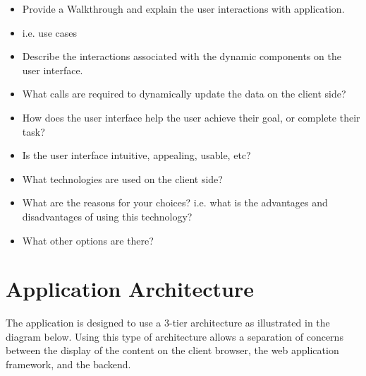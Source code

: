 \documentclass{sig-alt-release2}
\begin{document}
\begin{itemize}
\item	Provide a Walkthrough and explain the user interactions with application. %
\item	i.e. use cases
\item	Describe the interactions associated with the dynamic components on the user interface. %
\item	What calls are required to dynamically update the data on the client side?
\item	How does the user interface help the user achieve their goal, or complete their task? 
\item	Is the user interface intuitive, appealing, usable, etc?
\item	What technologies are used on the client side? %
\item	What are the reasons for your choices? i.e. what is the advantages and disadvantages of using this technology? %
\item	What other options are there? %
\end{itemize}

\section{Application Architecture}
The application is designed to use a 3-tier architecture as illustrated in the diagram below. Using this type of architecture allows
a separation of concerns between the display of the content on the client browser, the web application framework, and the backend.
\end{document}

